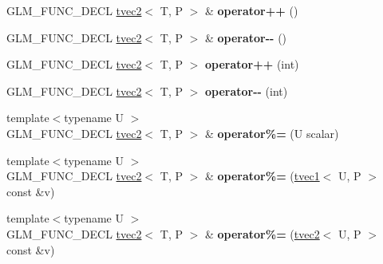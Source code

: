 \begin{DoxyCompactItemize}
\item 
\hypertarget{structglm_1_1tvec2_aee5dc4593579348b1f53ce6296337702}{G\-L\-M\-\_\-\-F\-U\-N\-C\-\_\-\-D\-E\-C\-L \hyperlink{structglm_1_1tvec2}{tvec2}$<$ T, P $>$ \& {\bfseries operator++} ()}\label{structglm_1_1tvec2_aee5dc4593579348b1f53ce6296337702}

\item 
\hypertarget{structglm_1_1tvec2_af751da3c19f0f22f8eb2bac9003f9384}{G\-L\-M\-\_\-\-F\-U\-N\-C\-\_\-\-D\-E\-C\-L \hyperlink{structglm_1_1tvec2}{tvec2}$<$ T, P $>$ \& {\bfseries operator-\/-\/} ()}\label{structglm_1_1tvec2_af751da3c19f0f22f8eb2bac9003f9384}

\item 
\hypertarget{structglm_1_1tvec2_ab479786d89c64c96e9611c7c93fb29c5}{G\-L\-M\-\_\-\-F\-U\-N\-C\-\_\-\-D\-E\-C\-L \hyperlink{structglm_1_1tvec2}{tvec2}$<$ T, P $>$ {\bfseries operator++} (int)}\label{structglm_1_1tvec2_ab479786d89c64c96e9611c7c93fb29c5}

\item 
\hypertarget{structglm_1_1tvec2_a4206b03754b7b3ba80a3a9365755f882}{G\-L\-M\-\_\-\-F\-U\-N\-C\-\_\-\-D\-E\-C\-L \hyperlink{structglm_1_1tvec2}{tvec2}$<$ T, P $>$ {\bfseries operator-\/-\/} (int)}\label{structglm_1_1tvec2_a4206b03754b7b3ba80a3a9365755f882}

\item 
\hypertarget{structglm_1_1tvec2_a274ddf6ee49b3c7f261c784b2147f6a0}{{\footnotesize template$<$typename U $>$ }\\G\-L\-M\-\_\-\-F\-U\-N\-C\-\_\-\-D\-E\-C\-L \hyperlink{structglm_1_1tvec2}{tvec2}$<$ T, P $>$ \& {\bfseries operator\%=} (U scalar)}\label{structglm_1_1tvec2_a274ddf6ee49b3c7f261c784b2147f6a0}

\item 
\hypertarget{structglm_1_1tvec2_a3750a63ccad2387d232a88a1abafa0aa}{{\footnotesize template$<$typename U $>$ }\\G\-L\-M\-\_\-\-F\-U\-N\-C\-\_\-\-D\-E\-C\-L \hyperlink{structglm_1_1tvec2}{tvec2}$<$ T, P $>$ \& {\bfseries operator\%=} (\hyperlink{structglm_1_1tvec1}{tvec1}$<$ U, P $>$ const \&v)}\label{structglm_1_1tvec2_a3750a63ccad2387d232a88a1abafa0aa}

\item 
\hypertarget{structglm_1_1tvec2_a3b939592b620fb6b0d7edd95c7863f0d}{{\footnotesize template$<$typename U $>$ }\\G\-L\-M\-\_\-\-F\-U\-N\-C\-\_\-\-D\-E\-C\-L \hyperlink{structglm_1_1tvec2}{tvec2}$<$ T, P $>$ \& {\bfseries operator\%=} (\hyperlink{structglm_1_1tvec2}{tvec2}$<$ U, P $>$ const \&v)}\label{structglm_1_1tvec2_a3b939592b620fb6b0d7edd95c7863f0d}


\end{DoxyCompactItemize}

